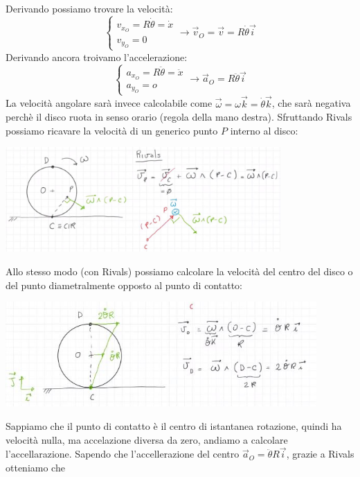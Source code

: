 Derivando possiamo trovare la velocità:
\[
    \begin{cases}
        v_{x_O} = R \dot{\theta} = \dot{x}\\
    v_{y_O} = 0
    \end{cases} \rightarrow \vec{v}_O = \vec{v} = R \dot{\theta} \vec{i}
\]
Derivando ancora troivamo l'accelerazione:
\[
    \begin{cases}
        a_{x_O} = R \ddot{\theta} = \ddot{x}\\
        a_{y_O} = o
    \end{cases} \rightarrow \vec{a}_O = R \ddot{\theta} \vec{i}
\]
La velocità angolare sarà invece calcolabile come $\vec{\omega} = \omega \vec{k} = \dot{\theta} \vec{k}$, che sarà negativa perchè il disco ruota in senso orario (regola della mano destra). Sfruttando Rivals possiamo ricavare la velocità di un generico punto $P$ interno al disco:
\begin{center}
    \includegraphics[height=4cm]{../lezione4/img3.JPG}
\end{center}
Allo stesso modo (con Rivals) possiamo calcolare la velocità del centro del disco o del punto diametralmente opposto al punto di contatto:
\begin{center}
    \includegraphics[height=4cm]{../lezione4/img4.JPG}
\end{center}
Sappiamo che il punto di contatto è il centro di istantanea rotazione, quindi ha velocità nulla, ma accelazione diversa da zero, andiamo a calcolare l'accellarazione. Sapendo che l'accellerazione del centro $\vec{a}_O = \ddot{\theta} R \vec{i}$, grazie a Rivals otteniamo che
